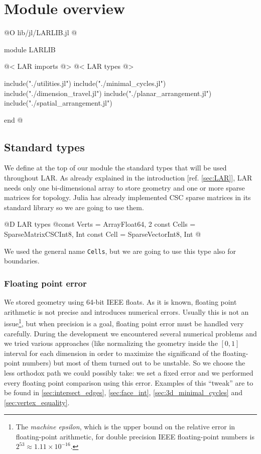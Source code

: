 \chapter{Module overview}

@O lib/jl/LARLIB.jl
@{module LARLIB

    @< LAR imports @>
    @< LAR types @>

    include("./utilities.jl")
    include("./minimal_cycles.jl")
    include("./dimension_travel.jl")
    include("./planar_arrangement.jl")
    include("./spatial_arrangement.jl")
    
end
@}

\section{Standard types}

We define at the top of our module the standard types
that will be used throughout LAR. As already explained
in the introduction [ref. \ref{sec:LAR}], LAR needs
only one bi-dimensional array to store geometry and 
one or more sparse matrices for topology.
Julia has already implemented CSC sparse matrices in
its standard library so we are going to use them.

@D LAR types
@{const Verts = Array{Float64, 2}
const Cells = SparseMatrixCSC{Int8, Int}
const Cell = SparseVector{Int8, Int}
@}

We used the general name \texttt{Cells}, but
we are going to use this type also for boundaries.

\subsection{Floating point error}
\label{sec:floating-point_error}

We stored geometry using 64-bit IEEE floats.
As it is known, floating point arithmetic is not
precise and introduces numerical errors.
Usually this is not an issue\footnote{The \textit{machine epsilon},
which is the upper bound on the relative error in floating-point 
arithmetic, for double precision IEEE floating-point numbers is 
$2^53 \approx 1.11 \times 10^{-16}$.}, but when precision is
a goal, floating point error must be handled very carefully.
During the development we encountered several numerical problems
and we tried various approaches (like normalizing the geometry
inside the $[0, 1]$ interval for each dimension in order to maximize
the significand of the floating-point numbers) but most of them turned 
out to be unstable. So we choose the less orthodox path we could
possibly take: we set a fixed error and we performed every floating point
comparison using this error. Examples of this ``tweak'' are to be found in
\ref{sec:intersect_edges}, \ref{sec:face_int}, \ref{sec:3d_minimal_cycles} and 
\ref{sec:vertex_equality}.

